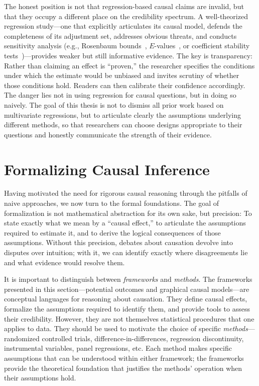 The honest position is not that regression-based causal claims are invalid, but that they occupy a different place on the credibility spectrum.
A well-theorized regression study---one that explicitly articulates its causal model, defends the completeness of its adjustment set, addresses obvious threats, and conducts sensitivity analysis (e.g., Rosenbaum bounds~\cite{rosenbaum2002observational}, $E$-values~\cite{vanderweele2017sensitivity}, or coefficient stability tests~\cite{oster2019unobservable})---provides weaker but still informative evidence.
The key is transparency: Rather than claiming an effect is ``proven,'' the researcher specifies the conditions under which the estimate would be unbiased and invites scrutiny of whether those conditions hold.
Readers can then calibrate their confidence accordingly.
The danger lies not in using regression for causal questions, but in doing so naively.
The goal of this thesis is not to dismiss all prior work based on multivariate regressions, but to articulate clearly the assumptions underlying different methods, so that researchers can choose designs appropriate to their questions and honestly communicate the strength of their evidence.

\section{Formalizing Causal Inference}
\label{sec:formalism}

Having motivated the need for rigorous causal reasoning through the pitfalls of naive approaches, we now turn to the formal foundations.
The goal of formalization is not mathematical abstraction for its own sake, but precision: To state exactly what we mean by a ``causal effect,'' to articulate the assumptions required to estimate it, and to derive the logical consequences of those assumptions.
Without this precision, debates about causation devolve into disputes over intuition; with it, we can identify exactly where disagreements lie and what evidence would resolve them.

It is important to distinguish between \emph{frameworks} and \emph{methods}.
The frameworks presented in this section---potential outcomes and graphical causal models---are conceptual languages for reasoning about causation.
They define causal effects, formalize the assumptions required to identify them, and provide tools to assess their credibility.
However, they are not themselves statistical procedures that one applies to data.
They should be used to motivate the choice of specific \emph{methods}---randomized controlled trials, difference-in-differences, regression discontinuity, instrumental variables, panel regressions, etc.
Each method makes specific assumptions that can be understood within either framework; the frameworks provide the theoretical foundation that justifies the methods' operation when their assumptions hold.

